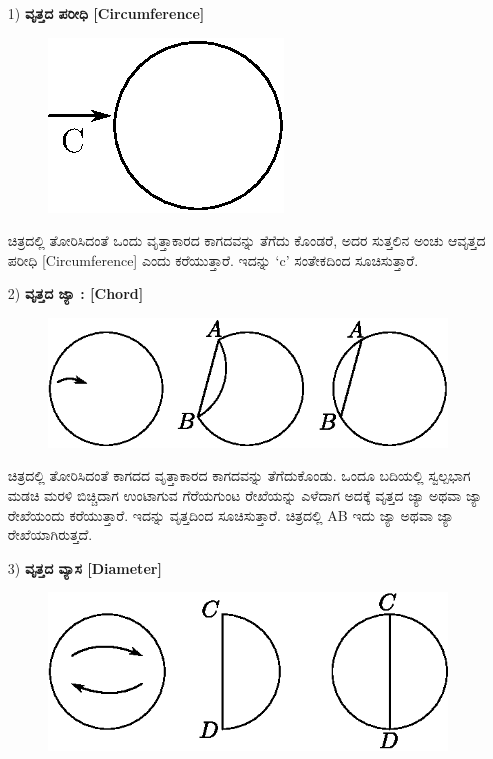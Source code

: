 \begin{enumerate}
\item[1)] \textbf{ವೃತ್ತದ ಪರೀಧಿ [Circumference]} 
\begin{figure}[H]
\centering
\includegraphics[scale=.98]{src/figure/chap1/fig1-24.eps}
\end{figure}
 
 ಚಿತ್ರದಲ್ಲಿ ತೋರಿಸಿದಂತೆ ಒಂದು ವೃತ್ತಾಕಾರದ ಕಾಗದವನ್ನು ತೆಗೆದು ಕೊಂಡರೆ, ಅದರ ಸುತ್ತಲಿನ ಅಂಚು ಆವೃತ್ತದ ಪರೀಧಿ [Circumference] ಎಂದು ಕರೆಯುತ್ತಾರೆ. ಇದನ್ನು `c' ಸಂತೇಕದಿಂದ ಸೂಚಿಸುತ್ತಾರೆ. 
 
\item[2)] \textbf{ವೃತ್ತದ ಜ್ಯಾ : [Chord]}
\begin{figure}[H]
\centering
\includegraphics[scale=.98]{src/figure/chap1/fig1-24a.eps}
\end{figure}
 
 ಚಿತ್ರದಲ್ಲಿ ತೋರಿಸಿದಂತೆ ಕಾಗದದ ವೃತ್ತಾಕಾರದ ಕಾಗದವನ್ನು ತೆಗೆದುಕೊಂಡು. ಒಂದೂ ಬದಿಯಲ್ಲಿ ಸ್ವಲ್ಪಭಾಗ ಮಡಚಿ ಮರಳಿ ಬಿಚ್ಚಿದಾಗ ಉಂಟಾಗುವ ಗೆರೆಯಗುಂಟ ರೇಖೆಯನ್ನು ಎಳೆದಾಗ ಅದಕ್ಕೆ ವೃತ್ತದ ಜ್ಯಾ ಅಥವಾ ಜ್ಯಾ ರೇಖೆಯಂದು ಕರೆಯುತ್ತಾರೆ. ಇದನ್ನು ವೃತ್ತದಿಂದ ಸೂಚಿಸುತ್ತಾರೆ. ಚಿತ್ರದಲ್ಲಿ AB ಇದು ಜ್ಯಾ ಅಥವಾ ಜ್ಯಾ ರೇಖೆಯಾಗಿರುತ್ತದೆ. 
 
 \eject
 
\item[3)] \textbf{ವೃತ್ತದ ವ್ಯಾಸ [Diameter]}
\begin{figure}[H]
\centering
\includegraphics[scale=.98]{src/figure/chap1/fig1-24b.eps}
\end{figure} 


\end{enumerate}

